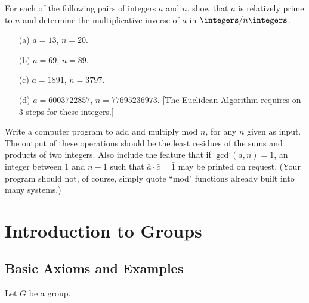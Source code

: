 
\begin{exercise}
	For each of the following pairs of integers $a$ and $n$, show that $a$ is relatively prime to $n$ and determine the multiplicative inverse of $\bar{a}$ in $\integers/n\integers$.
	\begin{enumerate}
		\item[(a)] $a = 13$, $n = 20$.
		\item[(b)] $a = 69$, $n = 89$.
		\item[(c)] $a = 1891$, $n = 3797$.
		\item[(d)] $a = 6003722857$, $n = 77695236973$. [The Euclidean Algorithm requires on 3 steps for these integers.]
	\end{enumerate}
\end{exercise}


\begin{exercise}
	Write a computer program to add and multiply mod $n$, for any $n$ given as input. The output of these operations should be the least residues of the sums and products of two integers. Also include the feature that if $\gcd(a,n) = 1$, an integer between 1 and $n - 1$ such that $\bar{a} \cdot \bar{c} = \bar{1}$ may be printed on request. (Your program should not, of course, simply quote ``mod" functions already built into many systems.)
\end{exercise}


\section{Introduction to Groups}

\subsection{Basic Axioms and Examples}

Let $G$ be a group.

